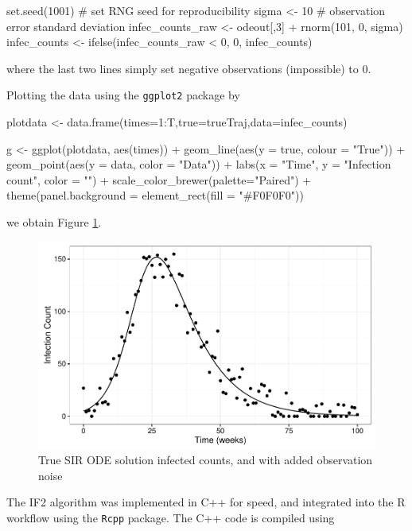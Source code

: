     \begin{R}
    set.seed(1001)  # set RNG seed for reproducibility
    sigma <- 10      # observation error standard deviation
    infec_counts_raw <- odeout[,3] + rnorm(101, 0, sigma)
    infec_counts     <- ifelse(infec_counts_raw < 0, 0, infec_counts)
    \end{R}

    where the last two lines simply set negative observations (impossible) to 0.

    Plotting the data using the \verb|ggplot2| package by

    \begin{R}
    plotdata <- data.frame(times=1:T,true=trueTraj,data=infec_counts)

	  g <- ggplot(plotdata, aes(times)) +
	        geom_line(aes(y = true, colour = "True")) +
	        geom_point(aes(y = data, color = "Data")) +
	        labs(x = "Time", y = "Infection count", color = "") +
	        scale_color_brewer(palette="Paired") +
	        theme(panel.background = element_rect(fill = "#F0F0F0"))
    \end{R}

    we obtain Figure \ref{dataplot}.

    \begin{figure}[H]
        \centering
        \includegraphics[width=\textwidth]{./images/dataplot.pdf}
        \caption{True SIR ODE solution infected counts, and with added observation noise}
        \label{dataplot}
    \end{figure}

    The IF2 algorithm was implemented in C++ for speed, and integrated into the R workflow using the \verb|Rcpp| package. The C++ code is compiled using

